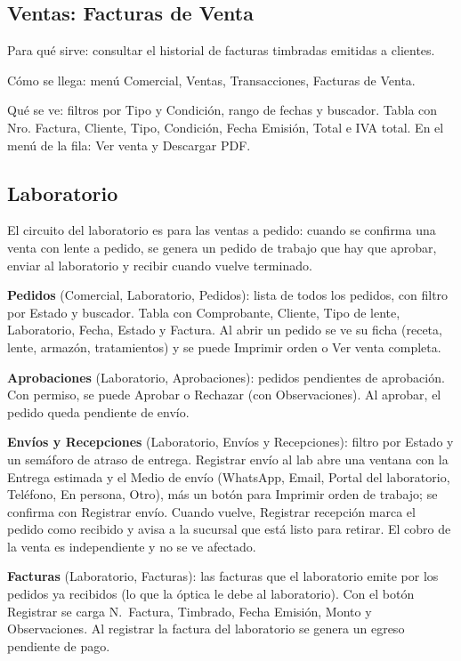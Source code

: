 \subsection{Ventas: Facturas de Venta}
\label{sec:mu-ventas-facturas}

Para qué sirve: consultar el historial de facturas timbradas emitidas a clientes.

Cómo se llega: menú Comercial, Ventas, Transacciones, Facturas de Venta.

Qué se ve: filtros por Tipo y Condición, rango de fechas y buscador. Tabla con Nro. Factura, Cliente, Tipo, Condición, Fecha Emisión, Total e IVA total. En el menú de la fila: Ver venta y Descargar PDF.

\subsection{Laboratorio}
\label{sec:mu-laboratorio}

El circuito del laboratorio es para las ventas a pedido: cuando se confirma una venta con lente a pedido, se genera un pedido de trabajo que hay que aprobar, enviar al laboratorio y recibir cuando vuelve terminado.

\textbf{Pedidos} (Comercial, Laboratorio, Pedidos): lista de todos los pedidos, con filtro por Estado y buscador. Tabla con Comprobante, Cliente, Tipo de lente, Laboratorio, Fecha, Estado y Factura. Al abrir un pedido se ve su ficha (receta, lente, armazón, tratamientos) y se puede Imprimir orden o Ver venta completa.

\textbf{Aprobaciones} (Laboratorio, Aprobaciones): pedidos pendientes de aprobación. Con permiso, se puede Aprobar o Rechazar (con Observaciones). Al aprobar, el pedido queda pendiente de envío.

\textbf{Envíos y Recepciones} (Laboratorio, Envíos y Recepciones): filtro por Estado y un semáforo de atraso de entrega. Registrar envío al lab abre una ventana con la Entrega estimada y el Medio de envío (WhatsApp, Email, Portal del laboratorio, Teléfono, En persona, Otro), más un botón para Imprimir orden de trabajo; se confirma con Registrar envío. Cuando vuelve, Registrar recepción marca el pedido como recibido y avisa a la sucursal que está listo para retirar. El cobro de la venta es independiente y no se ve afectado.

\textbf{Facturas} (Laboratorio, Facturas): las facturas que el laboratorio emite por los pedidos ya recibidos (lo que la óptica le debe al laboratorio). Con el botón Registrar se carga N.\ Factura, Timbrado, Fecha Emisión, Monto y Observaciones. Al registrar la factura del laboratorio se genera un egreso pendiente de pago.

